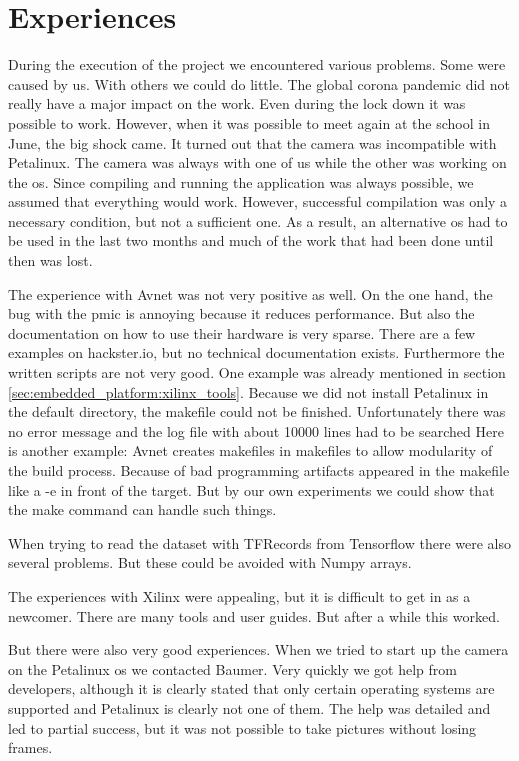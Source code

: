 \chapter*{Experiences}
\label{ch:experiences}

During the execution of the project we encountered various problems.
Some were caused by us.
With others we could do little.
The global corona pandemic did not really have a major impact on the work.
Even during the lock down it was possible to work.
However, when it was possible to meet again at the school in June, the big shock came.
It turned out that the camera was incompatible with Petalinux.
The camera was always with one of us while the other was working on the \acrlong{os}.
Since compiling and running the application was always possible, we assumed that everything would work.
However, successful compilation was only a necessary condition, but not a sufficient one.
As a result, an alternative \acrlong{os} had to be used in the last two months and much of the work that had been done until then was lost. 

The experience with Avnet was not very positive as well.
On the one hand, the bug with the \acrshort{pmic} is annoying because it reduces performance.
But also the documentation on how to use their hardware is very sparse.
There are a few examples on hackster.io, but no technical documentation exists.
Furthermore the written scripts are not very good.
One example was already mentioned in section \ref{sec:embedded_platform:xilinx_tools}.
Because we did not install Petalinux in the default directory, the makefile could not be finished.
Unfortunately there was no error message and the log file with about \num{10000} lines had to be searched
Here is another example:
Avnet creates makefiles in makefiles to allow modularity of the build process.
Because of bad programming artifacts appeared in the makefile like a -e in front of the target.
But by our own experiments we could show that the make command can handle such things.

When trying to read the dataset with TFRecords from Tensorflow there were also several problems.
But these could be avoided with Numpy arrays.

The experiences with Xilinx were appealing, but it is difficult to get in as a newcomer.
There are many tools and user guides.
But after a while this worked.

But there were also very good experiences.
When we tried to start up the camera on the Petalinux \acrshort{os} we contacted Baumer.
Very quickly we got help from developers, although it is clearly stated that only certain operating systems are supported and Petalinux is clearly not one of them.
The help was detailed and led to partial success, but it was not possible to take pictures without losing frames.

